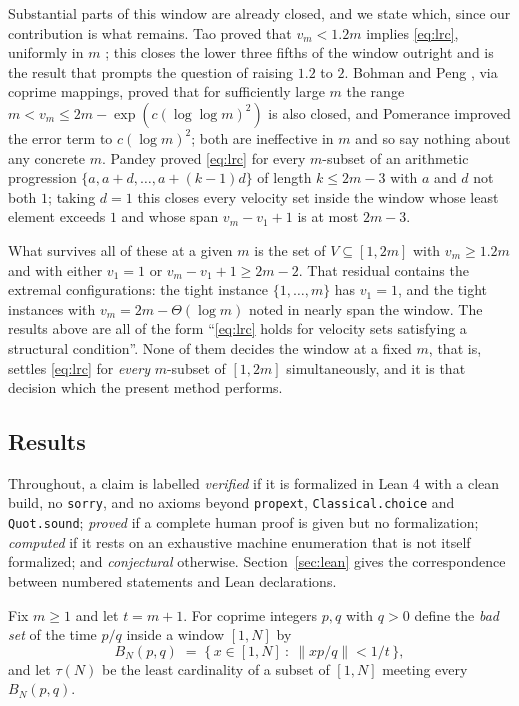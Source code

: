 \documentclass[11pt]{amsart}
\theoremstyle{plain}
\theoremstyle{definition}
\newcommand{\Norm}[1]{\left\lVert #1 \right\rVert}
\begin{document}
Substantial parts of this window are already closed, and we state which, since our contribution is
what remains. Tao \cite{Tao} proved that $v_m < 1.2m$ implies
\eqref{eq:lrc}, uniformly in $m$ \cite[Theorem 22]{PS}; this closes the lower three fifths of the window outright and is
the result that prompts the question of raising $1.2$ to $2$. Bohman and Peng \cite{BP}, via coprime
mappings, proved that for sufficiently large $m$ the range $m < v_m \le 2m - \exp(c(\log\log m)^2)$
is also closed, and Pomerance \cite{Pom} improved the error term to $c(\log m)^2$; both are
ineffective in $m$ and so say nothing about any concrete $m$. Pandey \cite{Pan} proved
\eqref{eq:lrc} for every $m$-subset of an arithmetic progression $\{a, a+d, \dots, a+(k-1)d\}$ of
length $k \le 2m-3$ with $a$ and $d$ not both $1$; taking $d = 1$ this closes every velocity set
inside the window whose least element exceeds $1$ and whose span $v_m - v_1 + 1$ is at most $2m-3$.

What survives all of these at a given $m$ is the set of $V \subseteq [1,2m]$ with $v_m \ge 1.2m$ and
with either $v_1 = 1$ or $v_m - v_1 + 1 \ge 2m-2$. That residual contains the extremal
configurations: the tight instance $\{1,\dots,m\}$ has $v_1 = 1$, and the tight instances with
$v_m = 2m - \Theta(\log m)$ noted in \cite[\S8.2]{PS} nearly span the window. The results above are
all of the form ``\eqref{eq:lrc} holds for velocity sets satisfying a structural condition''. None
of them decides the window at a fixed $m$, that is, settles \eqref{eq:lrc} for \emph{every}
$m$-subset of $[1,2m]$ simultaneously, and it is that decision which the present method performs.

\subsection{Results}

Throughout, a claim is labelled \emph{verified} if it is formalized in Lean 4 with a clean build,
no \texttt{sorry}, and no axioms beyond \texttt{propext}, \texttt{Classical.choice} and
\texttt{Quot.sound}; \emph{proved} if a complete human proof is given but no formalization;
\emph{computed} if it rests on an exhaustive machine enumeration that is not itself formalized;
and \emph{conjectural} otherwise. Section~\ref{sec:lean} gives the correspondence between numbered
statements and Lean declarations.

Fix $m \ge 1$ and let $t = m+1$. For coprime integers $p,q$ with $q > 0$ define the \emph{bad set}
of the time $p/q$ inside a window $[1,N]$ by
\[
  B_N(p,q) \;=\; \bigl\{\, x \in [1,N] \ :\ \Norm{x p / q} < 1/t \,\bigr\},
\]
and let $\tau(N)$ be the least cardinality of a subset of $[1,N]$ meeting every $B_N(p,q)$.
\end{document}
